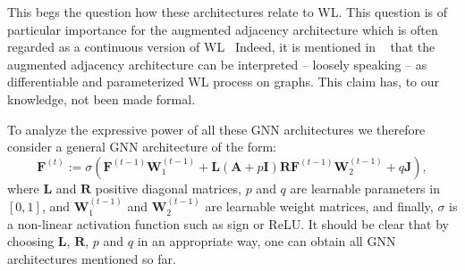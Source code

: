 This begs the question how these architectures relate to WL. This question is of particular importance for the augmented adjacency architecture which is often regarded as a continuous version of WL~\cite{kipf-loose}
Indeed, it is mentioned in ~\cite{kipf-loose} that the augmented adjacency architecture can be interpreted -- loosely speaking -- as differentiable and parameterized WL process on graphs. This claim has, to our knowledge, not been made formal.


To analyze the expressive power of all these GNN architectures we therefore consider a general GNN architecture of the form:
\begin{equation}
\mathbf{F}^{(t)}:=\sigma\left(\mathbf{F}^{(t-1)}\mathbf{W}_1^{(t-1)}+\mathbf{L}(\mathbf{A}+p\mathbf{I})\mathbf{R}\mathbf{F}^{(t-1)}\mathbf{W}_2^{(t-1)} + q\mathbf{J}\right), \label{eq:architecture}
\end{equation}
where $\mathbf{L}$ and $\mathbf{R}$ positive diagonal matrices, $p$ and $q$ are  learnable parameters in $[0,1]$, and $\mathbf{W}_1^{(t-1)}$ and $\mathbf{W}_2^{(t-1)}$  are learnable weight matrices, and finally, $\sigma$ is a non-linear activation function such as sign or ReLU. It should be clear that by choosing 
$\mathbf{L}$, $\mathbf{R}$, $p$ and $q$  in an appropriate way, one can obtain all  GNN architectures mentioned so far.

